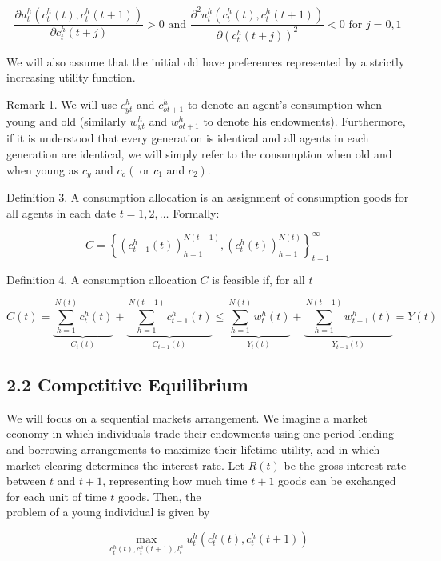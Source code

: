 \documentclass[10pt]{article}
\begin{document}
$$
\frac{\partial u_{t}^{h}\left(c_{t}^{h}(t), c_{t}^{h}(t+1)\right)}{\partial c_{t}^{h}(t+j)}>0 \text { and } \frac{\partial^{2} u_{t}^{h}\left(c_{t}^{h}(t), c_{t}^{h}(t+1)\right)}{\partial\left(c_{t}^{h}(t+j)\right)^{2}}<0 \text { for } j=0,1
$$

We will also assume that the initial old have preferences represented by a strictly increasing utility function.

Remark 1. We will use $c_{y t}^{h}$ and $c_{o t+1}^{h}$ to denote an agent's consumption when young and old (similarly $w_{y t}^{h}$ and $w_{o t+1}^{h}$ to denote his endowments). Furthermore, if it is understood that every generation is identical and all agents in each generation are identical, we will simply refer to the consumption when old and when young as $c_{y}$ and $c_{o}\left(\right.$ or $c_{1}$ and $\left.c_{2}\right)$.

Definition 3. A consumption allocation is an assignment of consumption goods for all agents in each date $t=1,2, \ldots$ Formally:

$$
C=\left\{\left(c_{t-1}^{h}(t)\right)_{h=1}^{N(t-1)},\left(c_{t}^{h}(t)\right)_{h=1}^{N(t)}\right\}_{t=1}^{\infty}
$$

Definition 4. A consumption allocation $C$ is feasible if, for all $t$

$$
C(t)=\underbrace{\sum_{h=1}^{N(t)} c_{t}^{h}(t)}_{C_{t}(t)}+\underbrace{\sum_{h=1}^{N(t-1)} c_{t-1}^{h}(t)}_{C_{t-1}(t)} \leq \underbrace{\sum_{h=1}^{N(t)} w_{t}^{h}(t)}_{Y_{t}(t)}+\underbrace{\sum_{h=1}^{N(t-1)} w_{t-1}^{h}(t)}_{Y_{t-1}(t)}=Y(t)
$$

\subsection*{2.2 Competitive Equilibrium}
We will focus on a sequential markets arrangement. We imagine a market economy in which individuals trade their endowments using one period lending and borrowing arrangements to maximize their lifetime utility, and in which market clearing determines the interest rate. Let $R(t)$ be the gross interest rate between $t$ and $t+1$, representing how much time $t+1$ goods can be exchanged for each unit of time $t$ goods. Then, the\\
problem of a young individual is given by


\begin{equation*}
\max _{c_{t}^{h}(t), c_{t}^{h}(t+1), l_{t}^{h}} u_{t}^{h}\left(c_{t}^{h}(t), c_{t}^{h}(t+1)\right) \tag{3}
\end{equation*}
\end{document}
